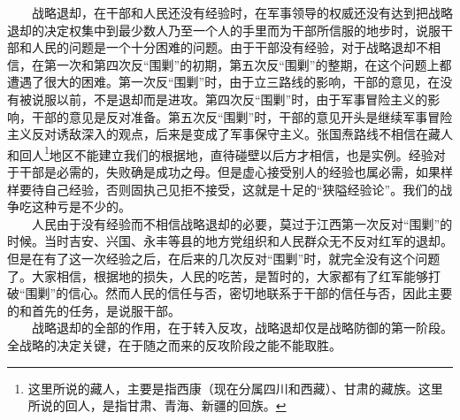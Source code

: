 \documentclass[cn,11pt,chinese]{elegantbook}
\begin{document}
　　战略退却，在干部和人民还没有经验时，在军事领导的权威还没有达到把战略退却的决定权集中到最少数人乃至一个人的手里而为干部所信服的地步时，说服干部和人民的问题是一个十分困难的问题。由于干部没有经验，对于战略退却不相信，在第一次和第四次反“围剿”的初期，第五次反“围剿”的整期，在这个问题上都遭遇了很大的困难。第一次反“围剿”时，由于立三路线的影响，干部的意见，在没有被说服以前，不是退却而是进攻。第四次反“围剿”时，由于军事冒险主义的影响，干部的意见是反对准备。第五次反“围剿”时，干部的意见开头是继续军事冒险主义反对诱敌深入的观点，后来是变成了军事保守主义。张国焘路线不相信在藏人和回人\footnote[46]{ 这里所说的藏人，主要是指西康（现在分属四川和西藏）、甘肃的藏族。这里所说的回人，是指甘肃、青海、新疆的回族。}地区不能建立我们的根据地，直待碰壁以后方才相信，也是实例。经验对于干部是必需的，失败确是成功之母。但是虚心接受别人的经验也属必需，如果样样要待自己经验，否则固执己见拒不接受，这就是十足的“狭隘经验论”。我们的战争吃这种亏是不少的。\\
　　人民由于没有经验而不相信战略退却的必要，莫过于江西第一次反对“围剿”的时候。当时吉安、兴国、永丰等县的地方党组织和人民群众无不反对红军的退却。但是在有了这一次经验之后，在后来的几次反对“围剿”时，就完全没有这个问题了。大家相信，根据地的损失，人民的吃苦，是暂时的，大家都有了红军能够打破“围剿”的信心。然而人民的信任与否，密切地联系于干部的信任与否，因此主要的和首先的任务，是说服干部。\\
　　战略退却的全部的作用，在于转入反攻，战略退却仅是战略防御的第一阶段。全战略的决定关键，在于随之而来的反攻阶段之能不能取胜。\\
\end{document}
